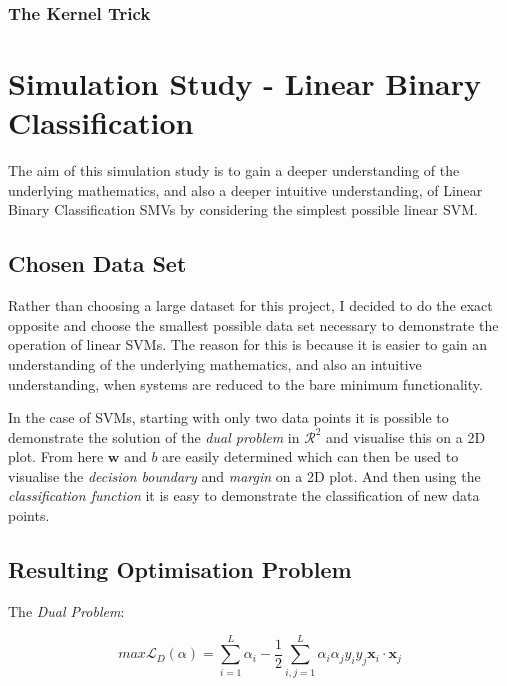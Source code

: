 \documentclass[10pt, a4paper,reqno]{amsart}
\begin{document}
\subsubsection{The Kernel Trick}




%
%
\clearpage\section{Simulation Study - Linear Binary Classification}

The aim of this simulation study is to gain a deeper understanding of the underlying mathematics, and also a deeper intuitive understanding, of Linear Binary Classification SMVs by considering the simplest possible linear SVM.

\subsection{Chosen Data Set}

Rather than choosing a large dataset for this project, I decided to do the exact opposite and choose the smallest possible data set necessary to demonstrate the operation of linear SVMs. The reason for this is because it is easier to gain an understanding of the underlying mathematics, and also an intuitive understanding, when systems are reduced to the bare minimum functionality.

In the case of SVMs, starting with only two data points it is possible to demonstrate the solution of the \emph{dual problem} in $\mathcal{R}^2$ and visualise this on a 2D plot. From here $\mathbf{w}$ and $b$ are easily determined which can then be used to visualise the \emph{decision boundary} and \emph{margin} on a 2D plot. And then using the \emph{classification function} it is easy to demonstrate the classification of new data points.


\subsection{Resulting Optimisation Problem}

The \emph{Dual Problem}:

\begin{equation}
max\mathcal{L}_D(\alpha) = \sum_{i=1}^{L}\alpha_i - \frac{1}{2}\sum_{i,j=1}^{L}\alpha_i \alpha_j y_i y_j\mathbf{x}_i\cdot\mathbf{x}_j
\end{equation}
\end{document}
